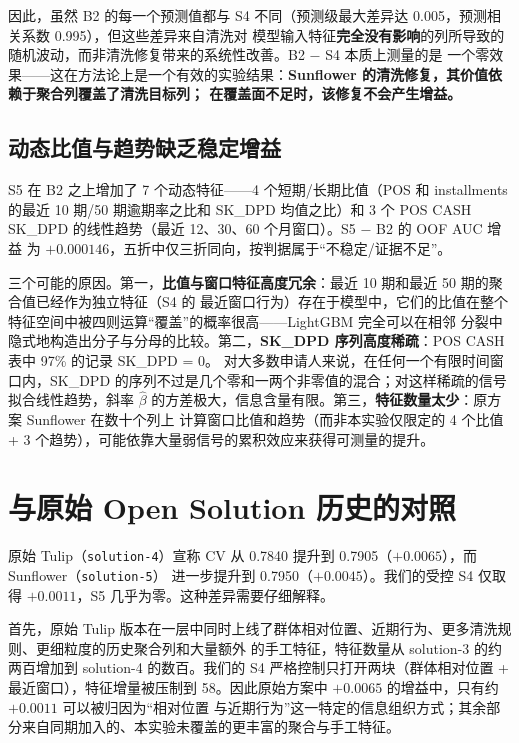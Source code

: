 \documentclass[11pt,UTF8,fontset=windows]{ctexrep}
\begin{document}
因此，虽然 B2 的每一个预测值都与 S4 不同（预测级最大差异达 0.005，预测相关系数 0.995），但这些差异来自清洗对
模型输入特征\textbf{完全没有影响}的列所导致的随机波动，而非清洗修复带来的系统性改善。B2 $-$ S4 本质上测量的是
一个零效果——这在方法论上是一个有效的实验结果：\textbf{Sunflower 的清洗修复，其价值依赖于聚合列覆盖了清洗目标列；
在覆盖面不足时，该修复不会产生增益。}

\subsection{动态比值与趋势缺乏稳定增益}

S5 在 B2 之上增加了 7 个动态特征——4 个短期/长期比值（POS 和 installments 的最近 10 期/50 期逾期率之比和
SK\_DPD 均值之比）和 3 个 POS CASH SK\_DPD 的线性趋势（最近 12、30、60 个月窗口）。S5 $-$ B2 的 OOF AUC 增益
为 $+0.000146$，五折中仅三折同向，按判据属于“不稳定/证据不足”。

三个可能的原因。第一，\textbf{比值与窗口特征高度冗余}：最近 10 期和最近 50 期的聚合值已经作为独立特征（S4 的
最近窗口行为）存在于模型中，它们的比值在整个特征空间中被四则运算“覆盖”的概率很高——LightGBM 完全可以在相邻
分裂中隐式地构造出分子与分母的比较。第二，\textbf{SK\_DPD 序列高度稀疏}：POS CASH 表中 97\% 的记录 SK\_DPD = 0。
对大多数申请人来说，在任何一个有限时间窗口内，SK\_DPD 的序列不过是几个零和一两个非零值的混合；对这样稀疏的信号
拟合线性趋势，斜率 $\hat\beta$ 的方差极大，信息含量有限。第三，\textbf{特征数量太少}：原方案 Sunflower 在数十个列上
计算窗口比值和趋势（而非本实验仅限定的 4 个比值 + 3 个趋势），可能依靠大量弱信号的累积效应来获得可测量的提升。

\section{与原始 Open Solution 历史的对照}

原始 Tulip（\texttt{solution-4}）宣称 CV 从 0.7840 提升到 0.7905（$+0.0065$），而 Sunflower（\texttt{solution-5}）
进一步提升到 0.7950（$+0.0045$）。我们的受控 S4 仅取得 $+0.0011$，S5 几乎为零。这种差异需要仔细解释。

首先，原始 Tulip 版本在一层中同时上线了群体相对位置、近期行为、更多清洗规则、更细粒度的历史聚合列和大量额外
的手工特征，特征数量从 solution-3 的约两百增加到 solution-4 的数百。我们的 S4 严格控制只打开两块（群体相对位置
+ 最近窗口），特征增量被压制到 58。因此原始方案中 $+0.0065$ 的增益中，只有约 $+0.0011$ 可以被归因为“相对位置
与近期行为”这一特定的信息组织方式；其余部分来自同期加入的、本实验未覆盖的更丰富的聚合与手工特征。
\end{document}
